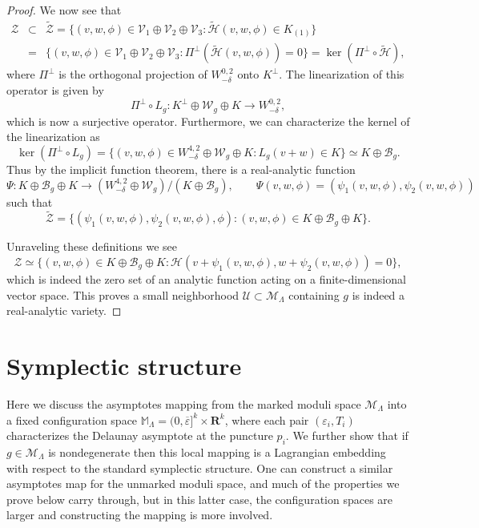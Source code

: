 \documentclass[reqno,11pt]{amsart}
\theoremstyle{tttheorem}
\newcommand{\R}{\mathbf{R}}
\begin{document}
\begin{proof}
We now see that 
\begin{eqnarray} 
\mathcal{Z} & \subset & \widetilde{\mathcal{Z}} = \{ (v,w,\phi) \in  \mathcal{V}_1 \oplus \mathcal{V}_2
\oplus \mathcal{V}_3 : 
\widetilde{\mathcal{H}}(v,w,\phi) \in K_{(1)} \} \\ \nonumber 
& = & \{ (v,w,\phi) \in  \mathcal{V}_1 \oplus \mathcal{V}_2
\oplus \mathcal{V}_3: \Pi^\perp (\widetilde{\mathcal{H}}(v,w,\phi)) = 0 \} 
= \ker (\Pi^\perp \circ \widetilde{\mathcal{H}}), 
\end{eqnarray} 
where $\Pi^\perp$ is the orthogonal projection of $W^{0,2}_{-\delta}$
onto $K^\perp$. The linearization of this operator is given by
$$\Pi^\perp \circ L_g: K^\perp \oplus \mathcal{W}_g \oplus K \rightarrow 
W^{0,2}_{-\delta},$$
which is now a surjective operator. Furthermore, we can characterize the 
kernel of the linearization as 
$$\ker (\Pi^\perp \circ L_g) = \{ (v,w,\phi) \in W^{4,2}_{-\delta} \oplus \mathcal{W}_g 
\oplus K : L_g (v+w) \in K\} \simeq K \oplus \mathcal{B}_g .$$
Thus by the implicit function theorem, there is a 
real-analytic function 
$$\Psi : K \oplus \mathcal{B}_{g} \oplus K \rightarrow (W^{4,2}_{-\delta} 
\oplus \mathcal{W}_g) /(K \oplus \mathcal{B}_g), \qquad \Psi(v,w,\phi) = 
(\psi_1(v,w,\phi), \psi_2(v,w,\phi)) $$
such that 
$$\widetilde{\mathcal{Z}} = \{ (\psi_1(v,w,\phi),\psi_2(v,w,\phi),\phi): 
(v,w,\phi) \in K \oplus \mathcal{B}_g \oplus K \} .$$

Unraveling these definitions we see 
$$\mathcal{Z} \simeq \{ (v,w,\phi) \in K \oplus \mathcal{B}_g \oplus K : 
\mathcal{H} (v+\psi_1(v,w,\phi), w+\psi_2(v,w,\phi)) = 0 \},$$
which is indeed the zero set of an analytic function acting on a 
finite-dimensional vector space. This proves a small neighborhood 
$\mathcal{U} \subset \mathcal{M}_\Lambda$ containing $g$ is indeed 
a real-analytic variety. 
\end{proof}

\section{Symplectic structure} \label{sec:symp}

Here we discuss the asymptotes mapping from  
the marked moduli space $\mathcal{M}_\Lambda$ into a fixed 
configuration space $\mathbb{M}_\Lambda = (0,\overline{\varepsilon}]^k 
\times \R^k$, where each pair $(\varepsilon_i, T_i)$ characterizes
the Delaunay asymptote at the puncture $p_i$. We further 
show that if $g \in \mathcal{M}_\Lambda$ is nondegenerate then 
this local mapping is a Lagrangian embedding with respect to 
the standard symplectic structure. One can 
construct a similar asymptotes map for the unmarked moduli 
space, and much of the properties we prove below carry through, 
but in this latter case, the configuration spaces are 
larger and constructing the mapping is more involved. 
\end{document}
